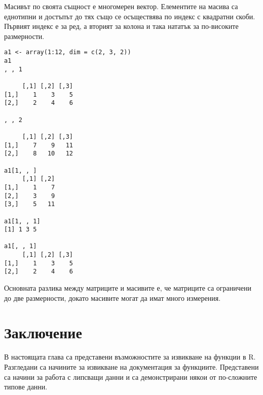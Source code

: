 Масивът по своята същност е многомерен вектор. Елементите на масива са еднотипни и достъпът до тях също се осъществява по индекс с квадратни скоби. Първият индекс е за ред, а вторият за колона и така нататък за по-високите размерности.

\begin{lstlisting}[caption=Работа с масиви, label=listing0052]
a1 <- array(1:12, dim = c(2, 3, 2))
a1
, , 1

     [,1] [,2] [,3]
[1,]    1    3    5
[2,]    2    4    6

, , 2

     [,1] [,2] [,3]
[1,]    7    9   11
[2,]    8   10   12

a1[1, , ]
     [,1] [,2]
[1,]    1    7
[2,]    3    9
[3,]    5   11
 
a1[1, , 1]
[1] 1 3 5
 
a1[, , 1]
     [,1] [,2] [,3]
[1,]    1    3    5
[2,]    2    4    6
\end{lstlisting}

Основната разлика между матриците и масивите е, че матриците са ограничени до две размерности, докато масивите могат да имат много измерения.

\section*{Заключение}

В настоящата глава са представени възможностите за извикване на функции в R. Разгледани са начините за извикване на документация за функциите. Представени са начини за работа с липсващи данни и са демонстрирани някои от по-сложните типове данни.

